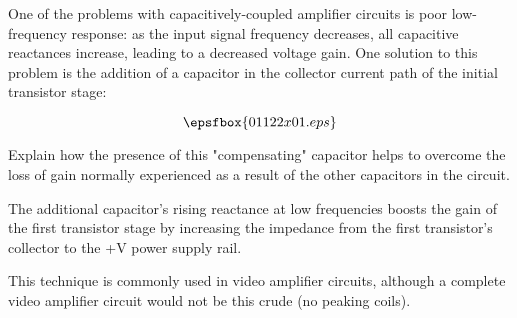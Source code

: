 

One of the problems with capacitively-coupled amplifier circuits is poor low-frequency response: as the input signal frequency decreases, all capacitive reactances increase, leading to a decreased voltage gain.  One solution to this problem is the addition of a capacitor in the collector current path of the initial transistor stage:

$$\epsfbox{01122x01.eps}$$

Explain how the presence of this "compensating" capacitor helps to overcome the loss of gain normally experienced as a result of the other capacitors in the circuit.







The additional capacitor's rising reactance at low frequencies boosts the gain of the first transistor stage by increasing the impedance from the first transistor's collector to the +V power supply rail.







This technique is commonly used in video amplifier circuits, although a complete video amplifier circuit would not be this crude (no peaking coils).




